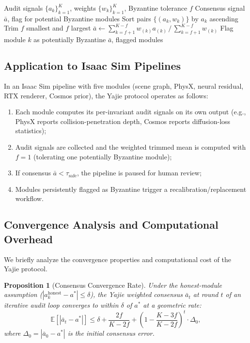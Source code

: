 \documentclass[11pt,twocolumn]{article}
\newtheorem{proposition}[theorem]{Proposition}
\theoremstyle{definition}
\newcommand{\E}{\mathbb{E}}
\begin{document}
\begin{algorithm}[t]
\caption{Weighted Yajie Consensus}
\label{alg:yajie}
\begin{algorithmic}[1]
\Require Audit signals $\{a_k\}_{k=1}^K$, weights $\{w_k\}_{k=1}^K$,
         Byzantine tolerance $f$
\Ensure Consensus signal $\bar{a}$, flag for potential Byzantine modules
\State Sort pairs $\{(a_k, w_k)\}$ by $a_k$ ascending
\State Trim $f$ smallest and $f$ largest
\State $\bar{a} \gets \sum_{k=f+1}^{K-f} w_{(k)} a_{(k)} \,/\, \sum_{k=f+1}^{K-f} w_{(k)}$
    \State Flag module $k$ as potentially Byzantine
  \EndIf
\EndFor
\State \Return $\bar{a}$, flagged modules
\end{algorithmic}
\end{algorithm}

\subsection{Application to Isaac Sim Pipelines}

In an Isaac Sim pipeline with five modules (scene graph, PhysX, neural
residual, RTX renderer, Cosmos prior), the Yajie protocol operates as
follows:
\begin{enumerate}[leftmargin=*,nosep]
  \item Each module computes its per-invariant audit signals on its own output
    (e.g., PhysX reports collision-penetration depth, Cosmos reports
    diffusion-loss statistics);
  \item Audit signals are collected and the weighted trimmed mean is computed
    with $f=1$ (tolerating one potentially Byzantine module);
  \item If consensus $\bar{a} < \tau_{\text{safe}}$, the pipeline is paused
    for human review;
  \item Modules persistently flagged as Byzantine trigger a
    recalibration/replacement workflow.
\end{enumerate}

\subsection{Convergence Analysis and Computational Overhead}

We briefly analyze the convergence properties and computational cost of the
Yajie protocol.

\begin{proposition}[Consensus Convergence Rate]
\label{prop:yajie_convergence}
Under the honest-module assumption ($|a_k^{\text{honest}} - a^*| \le \delta$),
the Yajie weighted consensus $\bar{a}_t$ at round $t$ of an iterative audit
loop converges to within $\delta$ of $a^*$ at a geometric rate:
\begin{equation}
  \E[|\bar{a}_t - a^*|] \le \delta + \frac{2f}{K-2f} +
  \left(1 - \frac{K-3f}{K-2f}\right)^t \cdot \Delta_0,
\end{equation}
where $\Delta_0 = |\bar{a}_0 - a^*|$ is the initial consensus error.
\end{proposition}
\end{document}
